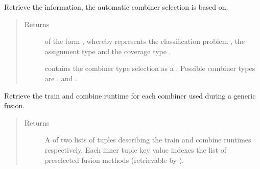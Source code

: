 \documentclass[letterpaper,10pt,english]{sphinxmanual}
\begin{document}
\begin{fulllineitems}
\begin{fulllineitems}
\begin{quote}
\begin{description}
\end{description}\end{quote}

\end{fulllineitems}


\begin{fulllineitems}
\label{\detokenize{pusion.control.decision_processor:pusion.control.decision_processor.DecisionProcessor.info}}
\sphinxAtStartPar
Retrieve the information, the automatic combiner selection is based on.
\begin{quote}\begin{description}
\item[{Returns}] \leavevmode
\sphinxAtStartPar

\sphinxAtStartPar
{} of the form , whereby  represents the classification problem
,  the assignment type  and 
the coverage type .

\sphinxAtStartPar
{} contains the combiner type selection as a .
Possible combiner types are ,  and .


\end{description}\end{quote}

\end{fulllineitems}


\begin{fulllineitems}
\label{\detokenize{pusion.control.decision_processor:pusion.control.decision_processor.DecisionProcessor.get_multi_combiner_runtimes}}
\sphinxAtStartPar
Retrieve the train and combine runtime for each combiner used during a generic fusion.
\begin{quote}\begin{description}
\item[{Returns}] \leavevmode
\sphinxAtStartPar
A  of two lists of tuples describing the train and combine runtimes respectively.
Each inner tuple key value indexes the list of preselected fusion methods
(retrievable by ).


\end{description}
\end{quote}
\end{fulllineitems}
\end{fulllineitems}
\end{document}
